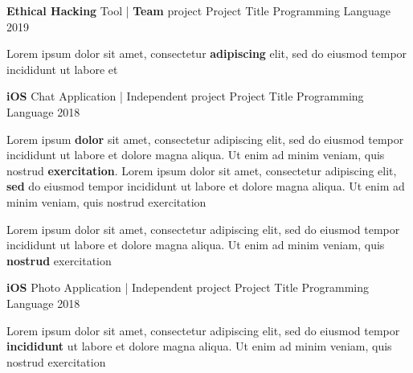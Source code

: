 

\begin{cventries}

  \cventry
    {\textbf{Ethical Hacking} Tool   |   \textbf{Team} project } %
    {Project Title} %
    {Programming Language} %
    {2019} %
    {
      \begin{cvitems} %
        \item {Lorem ipsum dolor sit amet, consectetur \textbf{adipiscing} elit, sed do eiusmod tempor incididunt ut labore et}
      \end{cvitems}
    }

  \cventry
    {\textbf{iOS} Chat Application   |   Independent project} %
    {Project Title} %
    {Programming Language} %
    {2018} %
    {
      \begin{cvitems} %
        \item {Lorem ipsum \textbf{dolor} sit amet, consectetur adipiscing elit, sed do eiusmod tempor incididunt ut labore et dolore magna aliqua. Ut enim ad minim veniam, quis nostrud \textbf{exercitation}. Lorem ipsum dolor sit amet, consectetur adipiscing elit, \textbf{sed} do eiusmod tempor incididunt ut labore et dolore magna aliqua. Ut enim ad minim veniam, quis nostrud exercitation}
        \item {Lorem ipsum dolor sit amet, consectetur adipiscing elit, sed do eiusmod tempor incididunt ut labore et dolore magna aliqua. Ut enim ad minim veniam, quis \textbf{nostrud} exercitation}
      \end{cvitems}
    }

  \cventry
    {\textbf{iOS }Photo Application    |   Independent project} %
    {Project Title} %
    {Programming Language} %
    {2018} %
    {
      \begin{cvitems} %
        \item {Lorem ipsum dolor sit amet, consectetur adipiscing elit, sed do eiusmod tempor \textbf{incididunt} ut labore et dolore magna aliqua. Ut enim ad minim veniam, quis nostrud exercitation}
      \end{cvitems}
    }

\end{cventries}
